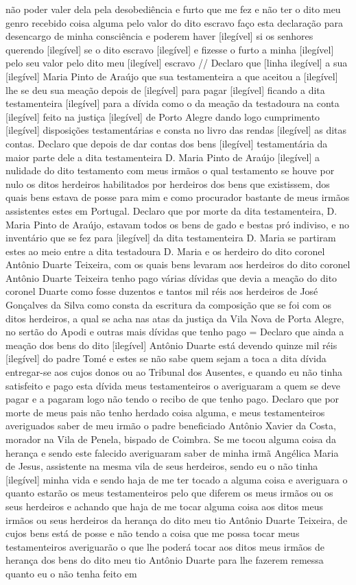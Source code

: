 \begin{refsection}
não poder valer dela pela desobediência e furto que me fez e não ter o dito meu genro recebido coisa alguma pelo valor do dito escravo faço esta declaração para desencargo de minha consciência e poderem haver [ilegível] si os senhores querendo [ilegível] se o dito escravo [ilegível] e fizesse o furto a minha [ilegível] pelo seu valor pelo dito meu [ilegível] escravo // Declaro que [linha ilegível] a sua [ilegível] Maria Pinto de Araújo que sua testamenteira a que aceitou a [ilegível] lhe se deu sua meação depois de [ilegível] para pagar [ilegível] ficando a dita testamenteira [ilegível] para a dívida como o da meação da testadoura na conta [ilegível] feito na justiça [ilegível] de Porto Alegre dando logo cumprimento [ilegível] disposições testamentárias e consta no livro das rendas [ilegível] as ditas contas. Declaro que depois de dar contas dos bens [ilegível] testamentária da maior parte dele a dita testamenteira D. Maria Pinto de Araújo [ilegível] a nulidade do dito testamento com meus irmãos o qual testamento se houve por nulo os ditos herdeiros habilitados por herdeiros dos bens que existissem, dos quais bens estava de posse para mim e como procurador bastante de meus irmãos assistentes estes em Portugal. Declaro que por morte da dita testamenteira, D. Maria Pinto de Araújo, estavam todos os bens de gado e bestas pró indiviso, e no inventário que se fez para [ilegível] da dita testamenteira D. Maria se partiram estes ao meio entre a dita testadoura D. Maria e os herdeiro do dito coronel Antônio Duarte Teixeira, com os quais bens levaram aos herdeiros do dito coronel Antônio Duarte Teixeira tenho pago várias dívidas que devia a meação do dito coronel Duarte como fosse duzentos e tantos mil réis aos herdeiros de José Gonçalves da Silva como consta da escritura da composição que se foi com os ditos herdeiros, a qual se acha nas atas da justiça da Vila Nova de Porta Alegre, no sertão do Apodi e outras mais dívidas que tenho pago = Declaro  que ainda a meação dos bens do dito [ilegível] Antônio Duarte está devendo quinze mil réis [ilegível] do padre Tomé e estes se não sabe quem sejam a toca a dita dívida entregar-se aos cujos donos ou ao Tribunal dos Ausentes, e quando eu não tinha satisfeito e pago esta dívida meus testamenteiros o averiguaram  a quem se deve pagar e a pagaram logo não tendo o recibo de que tenho pago. Declaro que por morte de meus pais não tenho herdado coisa alguma, e meus testamenteiros averiguados saber de meu irmão o padre beneficiado Antônio Xavier da Costa, morador na Vila de Penela, bispado de Coimbra. Se me tocou alguma coisa da herança e sendo este falecido averiguaram saber de minha irmã Angélica Maria de Jesus, assistente na mesma vila de seus herdeiros, sendo eu o não tinha [ilegível] minha vida e sendo haja de me ter tocado a alguma coisa e averiguara o quanto estarão os meus testamenteiros pelo que diferem os meus irmãos ou os seus herdeiros e achando que haja de me tocar alguma coisa aos ditos meus irmãos ou seus herdeiros da herança do dito meu tio Antônio Duarte Teixeira, de cujos bens está de posse e não tendo a coisa que me possa tocar meus testamenteiros averiguarão o que lhe poderá tocar aos ditos meus irmãos de herança dos bens do dito meu tio Antônio Duarte para lhe fazerem remessa quanto eu o não tenha feito em 
\end{refsection}
